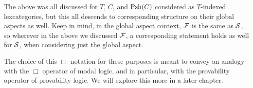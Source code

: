 The above was all discussed for $T$, $C$, and $\operatorname{Psh}(C)$ considered as $T$-indexed lexcategories, but this all descends to corresponding structure on their global aspects as well. Keep in mind, in the global aspect context, $\mathcal{F}$ is the same as $\mathcal{S}$, so wherever in the above we discussed $\mathcal{F}$, a corresponding statement holds as well for $\mathcal{S}$, when considering just the global aspect.

The choice of this $\Box$ notation for these purposes is meant to convey an analogy with the $\Box$ operator of modal logic, and in particular, with the provability operator of provability logic. We will explore this more in a later chapter. \TODO